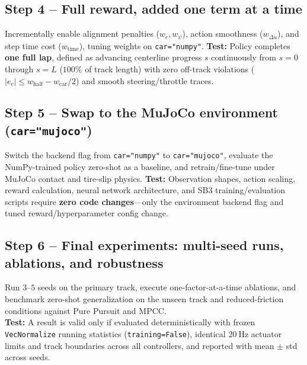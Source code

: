 \documentclass[11pt]{article}
\begin{document}
\subsection*{Step 4 -- Full reward, added one term at a time}
Incrementally enable alignment penalties ($w_c, w_\psi$), action smoothness ($w_{\Delta u}$), and step time cost ($w_{\text{time}}$), tuning weights on \texttt{car="numpy"}.
\textbf{Test:} Policy completes \textbf{one full lap}, defined as advancing centerline progress $s$ continuously from $s = 0$ through $s = L$ ($100\%$ of track length) with zero off-track violations ($|e_c| \le w_{\text{half}} - w_{\text{car}}/2$) and smooth steering/throttle traces.

\subsection*{Step 5 -- Swap to the MuJoCo environment (\texttt{car="mujoco"})}
Switch the backend flag from \texttt{car="numpy"} to \texttt{car="mujoco"}, evaluate the NumPy-trained policy zero-shot as a baseline, and retrain/fine-tune under MuJoCo contact and tire-slip physics.
\textbf{Test:} Observation shapes, action scaling, reward calculation, neural network architecture, and SB3 training/evaluation scripts require \textbf{zero code changes}---only the environment backend flag and tuned reward/hyperparameter config change.

\subsection*{Step 6 -- Final experiments: multi-seed runs, ablations, and robustness}
Run $3\text{--}5$ seeds on the primary track, execute one-factor-at-a-time ablations, and benchmark zero-shot generalization on the unseen track and reduced-friction conditions against Pure Pursuit and MPCC.\\
\textbf{Test:} A result is valid only if evaluated deterministically with frozen \texttt{VecNormalize} running statistics (\texttt{training=False}), identical $20~\text{Hz}$ actuator limits and track boundaries across all controllers, and reported with mean $\pm$ std across seeds.
\end{document}
